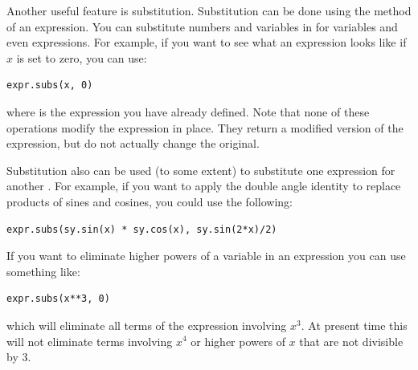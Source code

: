 Another useful feature is substitution.
Substitution can be done using the  method of an expression.
You can substitute numbers and variables in for variables and even expressions.
For example, if you want to see what an expression looks like if $x$ is set to zero, you can use:
\begin{lstlisting}
expr.subs(x, 0)
\end{lstlisting}
where  is the expression you have already defined.
Note that none of these operations modify the expression in place.
They return a modified version of the expression, but do not actually change the original.

Substitution also can be used (to some extent) to substitute one expression for another .
For example, if you want to apply the double angle identity to replace products of sines and cosines, you could use the following:
\begin{lstlisting}
expr.subs(sy.sin(x) * sy.cos(x), sy.sin(2*x)/2)
\end{lstlisting}
If you want to eliminate higher powers of a variable in an expression you can use something like:
\begin{lstlisting}
expr.subs(x**3, 0)
\end{lstlisting}
which will eliminate all terms of the expression involving $x^3$.
At present time this will not eliminate terms involving $x^4$ or higher powers of $x$ that are not divisible by 3.

